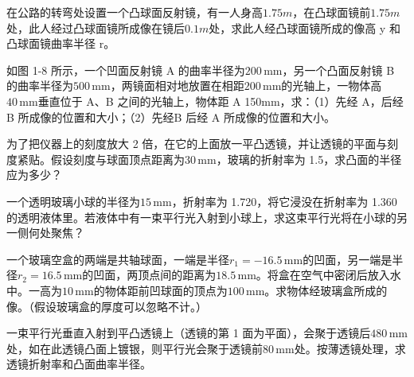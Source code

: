 \documentclass[padl, analysis, notocnum]{ExBook}
\newcommand{\answerarea}[1][3.5cm]{%
  \par\vspace{1mm}%
  \noindent{\color{themeColor!35}\rule{\linewidth}{0.4pt}}\par
  \noindent\begin{minipage}[t][#1][t]{\linewidth}\vspace{0pt}\end{minipage}\par
  \noindent{\color{themeColor!35}\rule{\linewidth}{0.4pt}}\par
}
\begin{document}
\begin{qitems}[startnum=4]
\qitem 在公路的转弯处设置一个凸球面反射镜，有一人身高$1.75m$，在凸球面镜前$1.75m$处，此人经过凸球面镜所成像在镜后$0.1m$处，求此人经凸球面镜所成的像高 y 和凸球面镜曲率半径 r。
\label{q:11:start}
\answerarea[7.0cm]
\label{q:11:end}
\end{qitems}

\begin{qitems}[startnum=5]
\qitem 如图 1-8 所示，一个凹面反射镜 A 的曲率半径为$200\,\mathrm{mm}$，另一个凸面反射镜 B 的曲率半径为$500\,\mathrm{mm}$，两镜面相对地放置在相距$200\,\mathrm{mm}$的光轴上，一物体高$40\,\mathrm{mm}$垂直位于 A、B 之间的光轴上，物体距 A 150mm，求：（1）先经 A，后经 B 所成像的位置和大小；（2）先经B 后经 A 所成像的位置和大小。
\label{q:12:start}
\answerarea[2.4cm]
\label{q:12:end}
\end{qitems}

\begin{qitems}[startnum=6]
\qitem 为了把仪器上的刻度放大 2 倍，在它的上面放一平凸透镜，并让透镜的平面与刻度紧贴。假设刻度与球面顶点距离为$30\,\mathrm{mm}$，玻璃的折射率为 1.5，求凸面的半径应为多少？
\label{q:13:start}
\answerarea[7.0cm]
\label{q:13:end}
\end{qitems}

\begin{qitems}[startnum=7]
\qitem 一个透明玻璃小球的半径为$15\,\mathrm{mm}$，折射率为 1.720，将它浸没在折射率为 1.360 的透明液体里。若液体中有一束平行光入射到小球上，求这束平行光将在小球的另一侧何处聚焦？
\label{q:14:start}
\answerarea[7.0cm]
\label{q:14:end}
\end{qitems}

\begin{qitems}[startnum=8]
\qitem 一个玻璃空盒的两端是共轴球面，一端是半径$r_{1}=-16.5\,\mathrm{mm}$的凹面，另一端是半径$r_{2}=16.5\,\mathrm{mm}$的凹面，两顶点间的距离为$18.5\,\mathrm{mm}$。将盒在空气中密闭后放入水中。一高为$10\,\mathrm{mm}$的物体距前凹球面的顶点为$100\,\mathrm{mm}$。求物体经玻璃盒所成的像。（假设玻璃盒的厚度可以忽略不计。）
\label{q:15:start}
\answerarea[7.0cm]
\label{q:15:end}
\end{qitems}

\begin{qitems}[startnum=9]
\qitem 一束平行光垂直入射到平凸透镜上（透镜的第 1 面为平面），会聚于透镜后$480\,\mathrm{mm}$处，如在此透镜凸面上镀银，则平行光会聚于透镜前$80\,\mathrm{mm}$处。按薄透镜处理，求透镜折射率和凸面曲率半径。
\label{q:16:start}
\answerarea[7.0cm]
\label{q:16:end}
\end{qitems}
\end{document}

